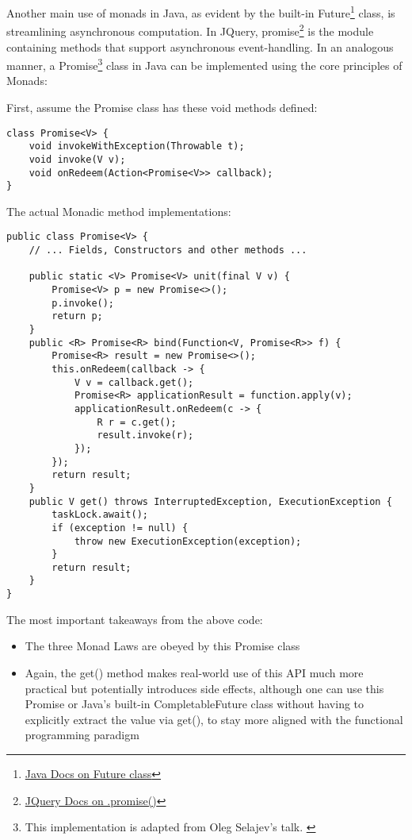 Another main use of monads in Java, as evident by the built-in Future\footnote{\href{https://docs.oracle.com/javase/7/docs/api/java/util/concurrent/Future.html}{Java Docs on Future class}} class, is streamlining asynchronous computation. In JQuery, promise\footnote{\href{https://api.jquery.com/promise/}{JQuery Docs on .promise()}} is the module containing methods that support asynchronous event-handling. In an analogous manner, a Promise\footnote{This implementation is adapted from Oleg Selajev's talk. \cite{oleg-selajev}} class in Java can be implemented using the core principles of Monads:

First, assume the Promise class has these void methods defined:
\begin{verbatim}
class Promise<V> {
    void invokeWithException(Throwable t);
    void invoke(V v); 
    void onRedeem(Action<Promise<V>> callback);
}
\end{verbatim}

The actual Monadic method implementations:
\begin{verbatim}
public class Promise<V> {
    // ... Fields, Constructors and other methods ...

    public static <V> Promise<V> unit(final V v) {
        Promise<V> p = new Promise<>();
        p.invoke();
        return p;
    }
    public <R> Promise<R> bind(Function<V, Promise<R>> f) {
        Promise<R> result = new Promise<>();
        this.onRedeem(callback -> {
            V v = callback.get();
            Promise<R> applicationResult = function.apply(v);
            applicationResult.onRedeem(c -> {
                R r = c.get();
                result.invoke(r);
            });
        });
        return result;
    }
    public V get() throws InterruptedException, ExecutionException {
        taskLock.await();
        if (exception != null) {
            throw new ExecutionException(exception);
        }
        return result;
    }
}
\end{verbatim}

The most important takeaways from the above code:

\begin{itemize}
    \item The three Monad Laws are obeyed by this Promise class
    \item Again, the get() method makes real-world use of this API much more practical but potentially introduces side effects, although one can use this Promise or Java's built-in CompletableFuture class without having to explicitly extract the value via get(), to stay more aligned with the functional programming paradigm
\end{itemize}

